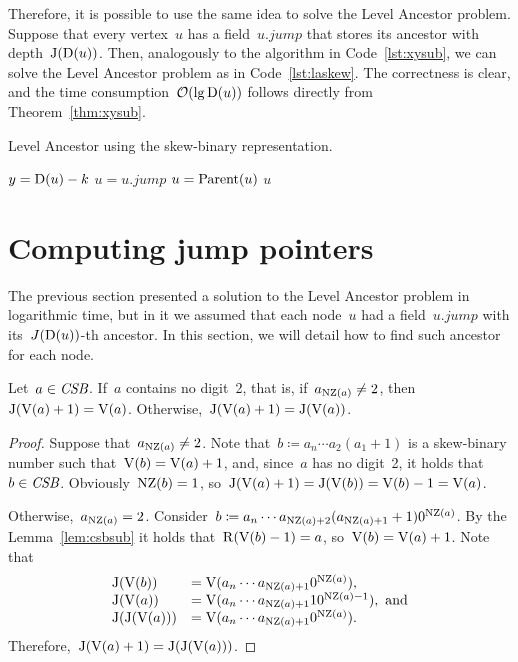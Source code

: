 \documentclass[main.tex]{subfiles}
\begin{document}
\newcommand{\jmp}{\mathit{jump}}

Therefore, it is possible to use the same idea to solve the Level Ancestor problem. Suppose that every vertex~$u$ has a field~$u.\jmp$ that stores its ancestor with depth~$\operatorname{J}(\operatorname{D}(u))$. Then, analogously to the algorithm in Code~\ref{lst:xysub}, we can solve the Level Ancestor problem as in Code~\ref{lst:laskew}. The correctness is clear, and the time consumption~$\mathcal{O}(\lg\operatorname{D}(u))$ follows directly from Theorem~\ref{thm:xysub}.

\begin{algorithm}
\caption{Level Ancestor using the skew-binary representation.} \label{lst:laskew}
\begin{algorithmic}[1]
		\State $y = \operatorname{D}(u) - k$
			\If{$\Dep(u.\jmp) \geq y$}
				\State $u = u.\jmp$
			\Else
				\State $u = \operatorname{Parent}(u)$
			\EndIf
		\EndWhile
		\State \Return $u$
	\EndFunction
\end{algorithmic}
\end{algorithm}

\section{Computing jump pointers}

The previous section presented a solution to the Level Ancestor problem in logarithmic time, but in it we assumed that each node~$u$ had a field~$u.\jmp$ with its~\mbox{$J(\operatorname{D}(u))$-th} ancestor. In this section, we will detail how to find such ancestor for each node.

\begin{theorem} \label{thm:csbj+1}
	Let~$a \in \textit{CSB}$. If~$a$ contains no digit~2, that is, if~$a_{\operatorname{NZ}(a)} \neq 2$, then~${\operatorname{J}(\operatorname{V}(a) + 1) = \operatorname{V}(a)}$. Otherwise,~$\operatorname{J}(\operatorname{V}(a) + 1) = \operatorname{J}(\operatorname{V}(a))$.
\end{theorem}
\begin{proof}
	Suppose that~$a_{\operatorname{NZ}(a)} \neq 2$. Note that~$b \coloneqq a_n \cdots a_2 (a_1 + 1)$ is a skew-binary number such that~${\operatorname{V}(b) = \operatorname{V}(a) + 1}$, and, since~$a$ has no digit~2, it holds that~${b \in \textit{CSB}}$. Obviously~${\operatorname{NZ}(b) = 1}$, so~${\operatorname{J}(\operatorname{V}(a) + 1) = \operatorname{J}(\operatorname{V}(b)) = \operatorname{V}(b) - 1 = \operatorname{V}(a)}$.

	Otherwise,~${a_{\operatorname{NZ}(a)} = 2}$. Consider~${b \coloneqq a_n \cdots a_{\operatorname{NZ}(a) + 2} (a_{\operatorname{NZ}(a) + 1} + 1) 0^{\operatorname{NZ}(a)}}$. By the Lemma~\ref{lem:csbsub} it holds that~${\operatorname{R}(\operatorname{V}(b) - 1) = a}$, so~${\operatorname{V}(b) = \operatorname{V}(a) + 1}$. Note that \vspace{-2ex}
	\[
	\begin{array}{ll}
		\operatorname{J}(\operatorname{V}(b))     &= \operatorname{V}(a_n \cdots a_{\operatorname{NZ}(a) + 1} 0^{\operatorname{NZ}(a)}), \\
		\operatorname{J}(\operatorname{V}(a))     &= \operatorname{V}(a_n \cdots a_{\operatorname{NZ}(a) + 1} 10^{\operatorname{NZ}(a)-1}),\text{ and} \\
		\operatorname{J}(\operatorname{J}(\operatorname{V}(a))) &= \operatorname{V}(a_n \cdots a_{\operatorname{NZ}(a) + 1} 0^{\operatorname{NZ}(a)}). \\
	\end{array}
	\]
	Therefore,~$\operatorname{J}(\operatorname{V}(a) + 1) = \operatorname{J}(\operatorname{J}(\operatorname{V}(a)))$.
\end{proof}
\end{document}
